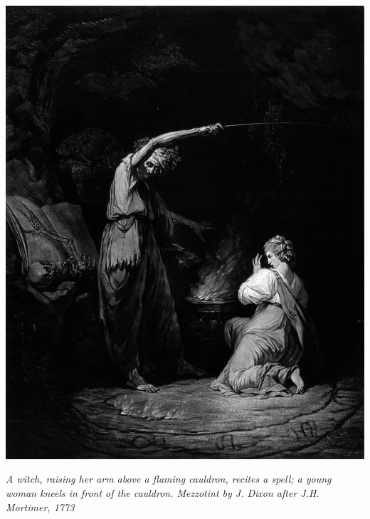 \vfill

\medskip

\begin{center}
\includegraphics[width=0.5\linewidth]{immagini/potion2.png}
\smallskip

\emph{A witch, raising her arm above a flaming cauldron, recites a spell; a young woman kneels in front of the cauldron. Mezzotint by J. Dixon after J.H. Mortimer, 1773}
\end{center}


%

\pagebreak




\pagebreak


